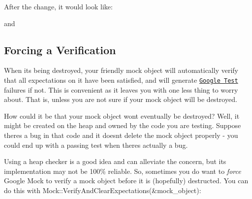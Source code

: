 After the change, it would look like\+:


\begin{DoxyCode}{0}
\DoxyCodeLine{}
\DoxyCodeLine{\};}
\end{DoxyCode}
 and 
\begin{DoxyCode}{0}
\DoxyCodeLine{}
\end{DoxyCode}


\subsection*{Forcing a Verification}

When it\textquotesingle{}s being destroyed, your friendly mock object will automatically verify that all expectations on it have been satisfied, and will generate \href{../../googletest/}{\tt Google Test} failures if not. This is convenient as it leaves you with one less thing to worry about. That is, unless you are not sure if your mock object will be destroyed.

How could it be that your mock object won\textquotesingle{}t eventually be destroyed? Well, it might be created on the heap and owned by the code you are testing. Suppose there\textquotesingle{}s a bug in that code and it doesn\textquotesingle{}t delete the mock object properly -\/ you could end up with a passing test when there\textquotesingle{}s actually a bug.

Using a heap checker is a good idea and can alleviate the concern, but its implementation may not be 100\% reliable. So, sometimes you do want to {\itshape force} Google Mock to verify a mock object before it is (hopefully) destructed. You can do this with {\ttfamily Mock\+::\+Verify\+And\+Clear\+Expectations(\&mock\+\_\+object)}\+:


